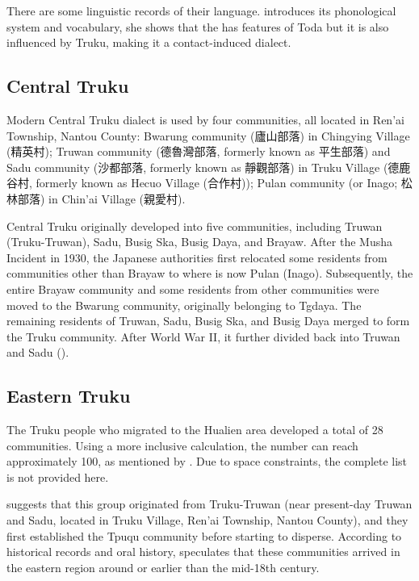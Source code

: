 There are some linguistic records of their language. \textcite{lee2015tawsa} introduces its phonological system and vocabulary, she shows that the has features of Toda but it is also influenced by Truku, making it a contact-induced dialect. 

\subsection{Central Truku}

Modern Central Truku dialect is used by four communities, all located in Ren'ai Township, Nantou County: Bwarung community (廬山部落) in Chingying Village (精英村); Truwan community (德魯灣部落, formerly known as 平生部落) and Sadu community (沙都部落, formerly known as 靜觀部落) in Truku Village (德鹿谷村, formerly known as Hecuo Village (合作村)); Pulan community (or Inago; 松林部落) in Chin'ai Village (親愛村).

Central Truku originally developed into five communities, including Truwan (Truku-Truwan), Sadu, Busig Ska, Busig Daya, and Brayaw. After the Musha Incident in 1930, the Japanese authorities first relocated some residents from communities other than Brayaw to where is now Pulan (Inago). Subsequently, the entire Brayaw community and some residents from other communities were moved to the Bwarung community, originally belonging to Tgdaya. The remaining residents of Truwan, Sadu, Busig Ska, and Busig Daya merged to form the Truku community. After World War II, it further divided back into Truwan and Sadu (\cite{Yap2011,Yap_ongoing_gaoshan}).

\subsection{Eastern Truku}

The Truku people who migrated to the Hualien area developed a total of 28 communities. Using a more inclusive calculation, the number can reach approximately 100, as mentioned by \textcite{liao1978Sedtheruy}. Due to space constraints, the complete list is not provided here. 

\textcite{liao1977Sedtheruy} suggests that this group originated from Truku-Truwan (near present-day Truwan and Sadu, located in Truku Village, Ren'ai Township, Nantou County), and they first established the Tpuqu community before starting to disperse. According to historical records and oral history, \textcite[200]{liao1978Sedtheruy} speculates that these communities arrived in the eastern region around or earlier than the mid-18th century.

